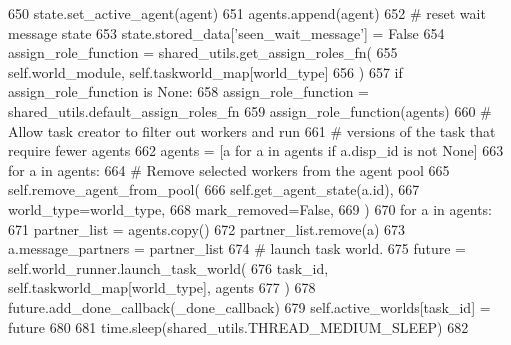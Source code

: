 \begin{DoxyCode}
650                             state.set\_active\_agent(agent)
651                             agents.append(agent)
652                             \textcolor{comment}{# reset wait message state}
653                             state.stored\_data[\textcolor{stringliteral}{'seen\_wait\_message'}] = \textcolor{keyword}{False}
654                         assign\_role\_function = shared\_utils.get\_assign\_roles\_fn(
655                             self.world\_module, self.taskworld\_map[world\_type]
656                         )
657                         \textcolor{keywordflow}{if} assign\_role\_function \textcolor{keywordflow}{is} \textcolor{keywordtype}{None}:
658                             assign\_role\_function = shared\_utils.default\_assign\_roles\_fn
659                         assign\_role\_function(agents)
660                         \textcolor{comment}{# Allow task creator to filter out workers and run}
661                         \textcolor{comment}{# versions of the task that require fewer agents}
662                         agents = [a \textcolor{keywordflow}{for} a \textcolor{keywordflow}{in} agents \textcolor{keywordflow}{if} a.disp\_id \textcolor{keywordflow}{is} \textcolor{keywordflow}{not} \textcolor{keywordtype}{None}]
663                         \textcolor{keywordflow}{for} a \textcolor{keywordflow}{in} agents:
664                             \textcolor{comment}{# Remove selected workers from the agent pool}
665                             self.remove\_agent\_from\_pool(
666                                 self.get\_agent\_state(a.id),
667                                 world\_type=world\_type,
668                                 mark\_removed=\textcolor{keyword}{False},
669                             )
670                         \textcolor{keywordflow}{for} a \textcolor{keywordflow}{in} agents:
671                             partner\_list = agents.copy()
672                             partner\_list.remove(a)
673                             a.message\_partners = partner\_list
674                         \textcolor{comment}{# launch task world.}
675                         future = self.world\_runner.launch\_task\_world(
676                             task\_id, self.taskworld\_map[world\_type], agents
677                         )
678                         future.add\_done\_callback(\_done\_callback)
679                         self.active\_worlds[task\_id] = future
680 
681             time.sleep(shared\_utils.THREAD\_MEDIUM\_SLEEP)
682 
\end{DoxyCode}
\mbox{\label{classparlai_1_1chat__service_1_1core_1_1chat__service__manager_1_1ChatServiceManager_a7e2ef8f0e63e1078cbffccbcaa6719b0}} 
